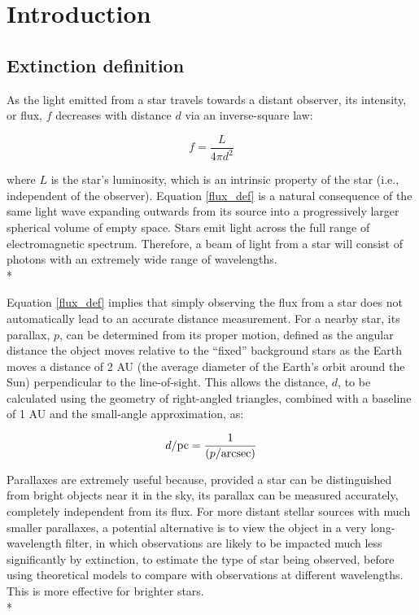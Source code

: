 \documentclass[12pt, a4paper]{report}
\begin{document}
\chapter{Introduction}
\section{Extinction definition} \label{ext_def}

As the light emitted from a star travels towards a distant observer, its intensity, or flux, $f$ decreases with distance $d$ via an inverse-square law:

\begin{equation}
\label{flux_def}
f = \frac{L}{4 \pi d^{2}}
\end{equation}

where $L$ is the star's luminosity, which is an intrinsic property of the star (i.e., independent of the observer). Equation \ref{flux_def} is a natural consequence of the same light wave expanding outwards from its source into a progressively larger spherical volume of empty space. Stars emit light across the full range of electromagnetic spectrum. Therefore, a beam of light from a star will consist of photons with an extremely wide range of wavelengths. \\*

Equation \ref{flux_def} implies that simply observing the flux from a star does not automatically lead to an accurate distance measurement. For a nearby star, its parallax, $p$, can be determined from its proper motion, defined as the angular distance the object moves relative to the ``fixed'' background stars as the Earth moves a distance of 2 AU  (the average diameter of the Earth's orbit around the Sun) perpendicular to the line-of-sight. This allows the distance, $d$, to be calculated using the geometry of right-angled triangles, combined with a baseline of 1 AU and the small-angle approximation, as:

\begin{equation}
d/\textnormal{pc} = \frac{1}{(p/\textnormal{arcsec})}
\end{equation}

Parallaxes are extremely useful because, provided a star can be distinguished from bright objects near it in the sky, its parallax can be measured accurately, completely independent from its flux. For more distant stellar sources with much smaller parallaxes, a potential alternative is to view the object in a very long-wavelength filter, in which observations are likely to be impacted much less significantly by extinction, to estimate the type of star being observed, before using theoretical models to compare with observations at different wavelengths. This is more effective for brighter stars. \\*
\end{document}
